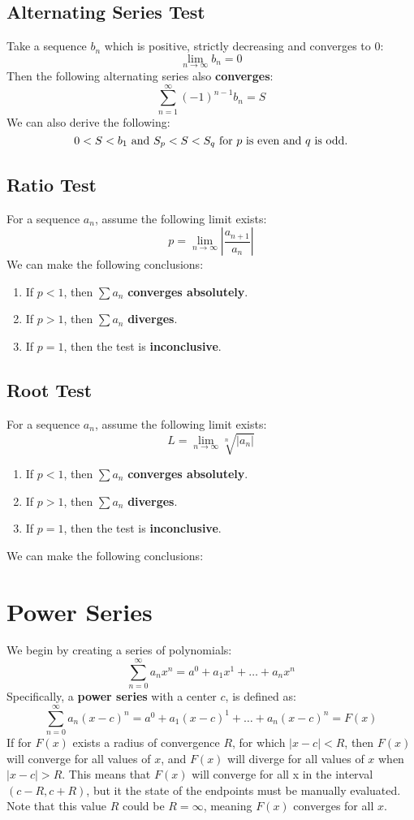 \documentclass[a4paper]{article}
\begin{document}
  \subsection{Alternating Series Test}
  Take a sequence $b_n$ which is positive, strictly decreasing and converges to 0:
  \[
    \lim_{n\rightarrow \infty} b_n = 0
  \]
  Then the following alternating series also \textbf{converges}:
  \[
    \sum_{n=1}^\infty (-1)^{n-1} b_n = S
  \]
  We can also derive the following:
  \[
    0 < S < b_1 \\ \textrm{ and } S_p < S < S_q \textrm{ for $p$ is even and $q$ is odd.}  
  \]
  \subsection{Ratio Test}
  For a sequence $a_n$, assume the following limit exists:
  \[
    p = \lim_{n\rightarrow \infty} |\displaystyle\frac{a_{n+1}}{a_n}|
  \]
  We can make the following conclusions:
  \begin{enumerate}
    \item If $p<1$, then $\sum a_n$ \textbf{converges absolutely}.
    \item If $p>1$, then $\sum a_n$ \textbf{diverges}.
    \item If $p=1$, then the test is \textbf{inconclusive}.
  \end{enumerate}
  \subsection{Root Test}
  For a sequence $a_n$, assume the following limit exists:
  \[
    L = \lim_{n\rightarrow \infty} \sqrt[n]{|a_n|}
  \]
  \begin{enumerate}
    \item If $p<1$, then $\sum a_n$ \textbf{converges absolutely}.
    \item If $p>1$, then $\sum a_n$ \textbf{diverges}.
    \item If $p=1$, then the test is \textbf{inconclusive}.
  \end{enumerate}
  We can make the following conclusions:
  \section{Power Series} 
  We begin by creating a series of polynomials:
  \[
    \sum_{n=0}^\infty a_n x^n = a^0 + a_1 x^1 + \dots + a_n x^n
  \]
  Specifically, a \textbf{power series} with a center $c$, is defined as:
  \[
    \sum_{n=0}^\infty a_n (x-c)^n = a^0 + a_1 (x-c)^1 + \dots + a_n (x-c)^n = F(x)
  \]
  If for $F(x)$ exists a radius of convergence $R$, for which $|x-c| <R$, then $F(x)$ will converge for all values of $x$, and $F(x)$ will diverge for all values of $x$ when $|x-c| >R$. This means that $F(x)$ will converge for all x in the interval $(c-R, c+R)$, but it the state of the endpoints must be manually evaluated. Note that this value $R$ could be $R=\infty$, meaning $F(x)$ converges for all $x$.
\end{document}
